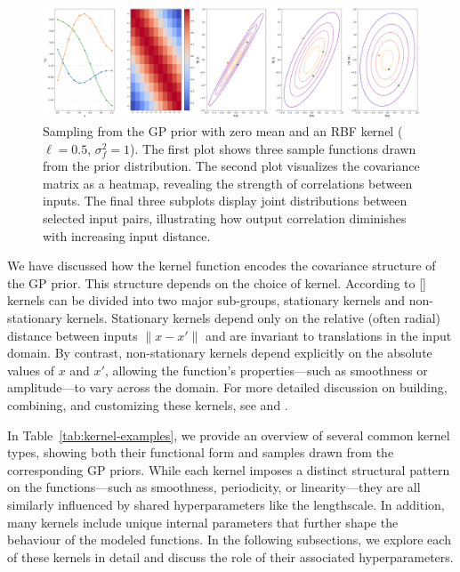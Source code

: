 \documentclass[12pt]{article}
\begin{document}
\begin{figure}[H]
    \centering
       \includegraphics[width=1\textwidth]{LatexPlots/1dplots/Kernel_background.png}
        \caption{Sampling from the GP prior with zero mean and an RBF kernel ($\ell = 0.5$, $\sigma_f^2 = 1$). 
        The first plot shows three sample functions drawn from the prior distribution. 
        The second plot visualizes the covariance matrix as a heatmap, revealing the strength of correlations between inputs.
        The final three subplots display joint distributions between selected input pairs, illustrating how output correlation diminishes with increasing input distance.}
    \label{fig: samples_from_GP_prior}
\end{figure}


\noindent
We have discussed how the kernel function encodes the covariance structure of the GP prior. This structure depends on the choice of kernel. According to [\cite{bible}]
kernels can be divided into two major sub-groups, stationary kernels and non-stationary kernels. 
Stationary kernels depend only on the relative (often radial) distance between inputs \(\|x - x'\|\) and are invariant to translations 
in the input domain. By contrast, non-stationary kernels depend explicitly on 
the absolute values of \(x\) and \(x'\), allowing the function’s properties—such as smoothness 
or amplitude—to vary across the domain. For more detailed discussion on building, combining, and customizing these kernels, 
see \cite{kernelcookbook} and \cite[Ch.~4]{bible}.

\bigskip

\noindent
In Table~\ref{tab:kernel-examples}, we provide an overview of several common kernel types, 
showing both their functional form and samples drawn from the corresponding GP priors. 
While each kernel imposes a distinct structural pattern on the functions—such as smoothness, periodicity, or linearity—they are all similarly influenced by shared hyperparameters like the lengthscale. 
In addition, many kernels include unique internal parameters that further shape the behaviour of the modeled functions. 
In the following subsections, we explore each of these kernels in detail and discuss the role of their associated hyperparameters.
\end{document}
